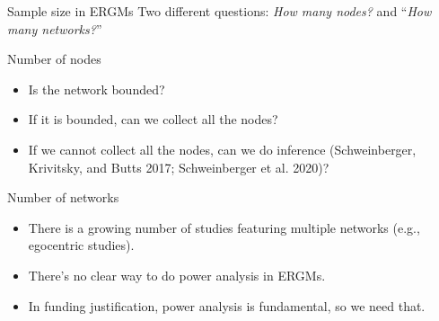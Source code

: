 \documentclass[
  ignorenonframetext,
  aspectratio=169,
]{beamer}
\begin{document}
\begin{frame}{Sample size in ERGMs}
\protect\hypertarget{sample-size-in-ergms}{}
Two different questions: \emph{How many nodes?} and ``\emph{How many
networks?}''

\begin{block}{Number of nodes}
\protect\hypertarget{number-of-nodes}{}
\begin{itemize}
\item
  Is the network bounded?
\item
  If it is bounded, can we collect all the nodes?
\item
  If we cannot collect all the nodes, can we do inference
  (Schweinberger, Krivitsky, and Butts 2017; Schweinberger et al. 2020)?
\end{itemize}
\end{block}

\begin{block}{Number of networks}
\protect\hypertarget{number-of-networks}{}
\begin{itemize}
\item
  There is a growing number of studies featuring multiple networks
  (e.g., egocentric studies).
\item
  There's no clear way to do power analysis in ERGMs.
\item
  In funding justification, power analysis is fundamental, so we need
  that.
\end{itemize}
\end{block}
\end{frame}
\end{document}
